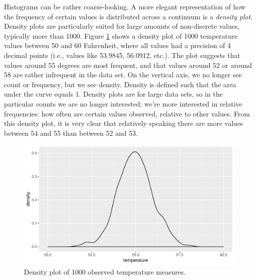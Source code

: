 \documentclass[]{report}\usepackage[]{graphicx}\usepackage[]{color}
\makeatletter
\def\maxwidth{ %
  \ifdim\Gin@nat@width>\linewidth
    \linewidth
  \else
    \Gin@nat@width
  \fi
}
\newenvironment{knitrout}{}{} %
\makeatother
\begin{document}
% 
% 
% 
Histograms can be rather coarse-looking. A more elegant representation of how the frequency of certain values is distributed across a continuum is a \textit{density plot}. Density plots are particularly suited for large amounts of non-discrete values, typically more than 1000. Figure \ref{fig:distr_3} shows a density plot of 1000 temperature values between 50 and 60 Fahrenheit, where all values had a precision of 4 decimal points (i.e., values like 53.9845, 56.0912, etc.). The plot suggests that values around 55 degrees are most frequent, and that values around 52 or around 58 are rather infrequent in the data set. On the vertical axis, we no longer see count or frequency, but we see density. Density is defined such that the area under the curve equals 1. Density plots are for large data sets, so in the particular counts we are no longer interested: we're more interested in relative frequencies: how often are certain values observed, relative to other values. From this density plot, it is very clear that relatively speaking there are more values between 54 and 55 than between 52 and 53.

\begin{knitrout}
\color{fgcolor}\begin{figure}

{\centering \includegraphics[width=\maxwidth]{figure/distr_3-1} 

}

\caption[Density plot of 1000 observed temperature measures]{Density plot of 1000 observed temperature measures.}\label{fig:distr_3}
\end{figure}


\end{knitrout}
\end{document}
